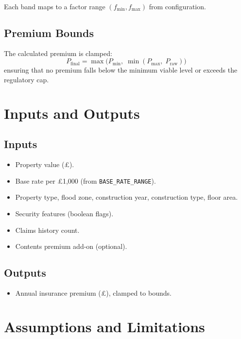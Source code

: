 \documentclass[11pt,a4paper]{article}
\begin{document}
Each band maps to a factor range $(f_{\min}, f_{\max})$ from configuration.

\subsection{Premium Bounds}

The calculated premium is clamped:
\[
    P_{\text{final}} = \max\!\big(P_{\min},\; \min(P_{\max},\; P_{\text{raw}})\big)
\]
ensuring that no premium falls below the minimum viable level or exceeds the
regulatory cap.


\section{Inputs and Outputs}

\subsection{Inputs}
\begin{itemize}[nosep]
    \item Property value (\pounds).
    \item Base rate per \pounds1,000 (from \texttt{BASE\_RATE\_RANGE}).
    \item Property type, flood zone, construction year, construction type, floor area.
    \item Security features (boolean flags).
    \item Claims history count.
    \item Contents premium add-on (optional).
\end{itemize}

\subsection{Outputs}
\begin{itemize}[nosep]
    \item Annual insurance premium (\pounds), clamped to bounds.
\end{itemize}


\section{Assumptions and Limitations}
\end{document}
